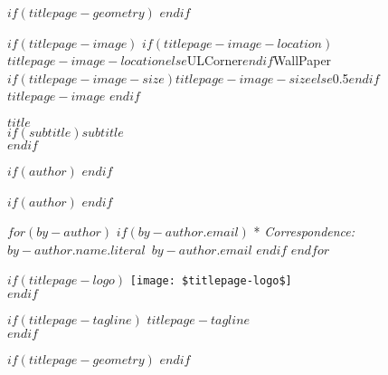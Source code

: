 
\thispagestyle{empty} %

$if(titlepage-geometry)$
$endif$
\begin{minipage}[b][\textheight][s]{\textwidth}
\raggedright

$if(titlepage-image)$
\This$if(titlepage-image-location)$$titlepage-image-location$$else$ULCorner$endif$WallPaper{$if(titlepage-image-size)$$titlepage-image-size$$else$0.5$endif$}{$titlepage-image$}
$endif$

{\huge\bfseries\nohyphens{$title$}}\\[1\baselineskip] 
$if(subtitle)${\large{$subtitle$}}\\[4\baselineskip]$endif$
	
$if(author)$
{\titlepageauthoralign
{\titlepageauthorblock}
}
$endif$

\vspace{2\baselineskip} 

$if(author)$
{\titlepageaffiliationalign
\titlepageaffiliationblock
}
$endif$

\vspace{1\baselineskip} 

$for(by-author)$
$if(by-author.email)$
* \textit{Correspondence:}~$by-author.name.literal$~$by-author.email$
$endif$
$endfor$

\vfill

$if(titlepage-logo)$
\texttt{[image: \$titlepage-logo\$]}\\
$endif$

\vspace{1\baselineskip} 

$if(titlepage-tagline)$
{\noindent $titlepage-tagline$}\\[\baselineskip]
$endif$

\end{minipage}
$if(titlepage-geometry)$
\restoregeometry
$endif$
